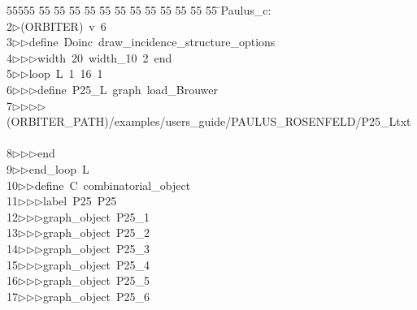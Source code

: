 %
%
\begin{tabbing}
55555 \= 55 \= 55 \= 55 \= 55 \= 55 \= 55 \= 55 \= 55 \= 55 \= 55 \= 55 \= 55 \= \>Paulus\_c:\\[0pt]
2\>$\triangleright$\>(ORBITER)\ v\ 6\ \\[0pt]
3\>$\triangleright$\>$\triangleright$\>define\ Doinc\ draw\_incidence\_structure\_options\ \\[0pt]
4\>$\triangleright$\>$\triangleright$\>$\triangleright$\>width\ 20\ width\_10\ 2\ end\ \\[0pt]
5\>$\triangleright$\>$\triangleright$\>loop\ L\ 1\ 16\ 1\ \\[0pt]
6\>$\triangleright$\>$\triangleright$\>$\triangleright$\>define\ P25\_L\ graph\ load\_Brouwer\ \\[0pt]
7\>$\triangleright$\>$\triangleright$\>$\triangleright$\>$\triangleright$\>(ORBITER\_PATH)/examples/users\_guide/PAULUS\_ROSENFELD/P25\_Ltxt\ \\[0pt]
8\>$\triangleright$\>$\triangleright$\>$\triangleright$\>end\ \\[0pt]
9\>$\triangleright$\>$\triangleright$\>end\_loop\ L\ \\[0pt]
10\>$\triangleright$\>$\triangleright$\>define\ C\ combinatorial\_object\ \\[0pt]
11\>$\triangleright$\>$\triangleright$\>$\triangleright$\>label\ P25\ P25\ \\[0pt]
12\>$\triangleright$\>$\triangleright$\>$\triangleright$\>graph\_object\ P25\_1\ \\[0pt]
13\>$\triangleright$\>$\triangleright$\>$\triangleright$\>graph\_object\ P25\_2\ \\[0pt]
14\>$\triangleright$\>$\triangleright$\>$\triangleright$\>graph\_object\ P25\_3\ \\[0pt]
15\>$\triangleright$\>$\triangleright$\>$\triangleright$\>graph\_object\ P25\_4\ \\[0pt]
16\>$\triangleright$\>$\triangleright$\>$\triangleright$\>graph\_object\ P25\_5\ \\[0pt]
17\>$\triangleright$\>$\triangleright$\>$\triangleright$\>graph\_object\ P25\_6\ \\[0pt]

\end{tabbing}
